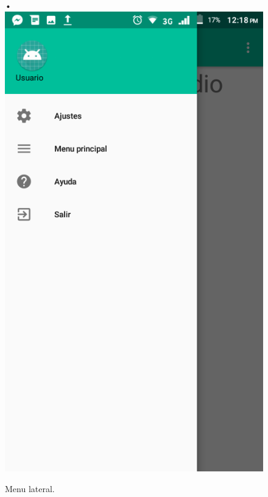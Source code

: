 \begin{center}
\begin{figure}[H]
•\includegraphics[scale=0.3]{img/7.png} 
\caption{Menu lateral.}
\end{figure}
\end{center}

